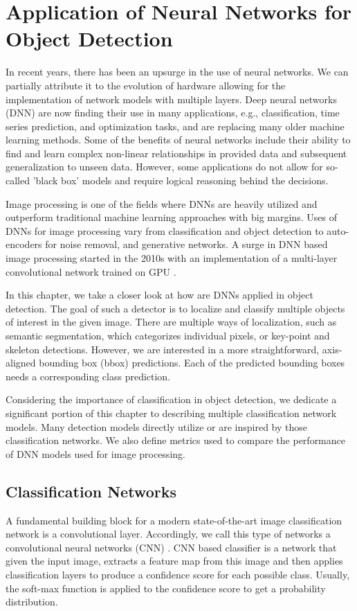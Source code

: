\chapter{Application of Neural Networks for Object Detection}
\label{chap:nns}
In recent years, there has been an upsurge in the use of neural networks. We can partially attribute it to the evolution of hardware allowing for the implementation of network models with multiple layers. Deep neural networks (DNN) are now finding their use in many applications, e.g., classification, time series prediction, and optimization tasks, and are replacing many older machine learning methods. Some of the benefits of neural networks include their ability to find and learn complex non-linear relationships in provided data and subsequent generalization to unseen data. However, some applications do not allow for so-called 'black box' models and require logical reasoning behind the decisions.

Image processing is one of the fields where DNNs are heavily utilized and outperform traditional machine learning approaches with big margins. Uses of DNNs for image processing vary from classification and object detection to auto-encoders for noise removal, and generative networks. A surge in DNN based image processing started in the 2010s with an implementation of a multi-layer convolutional network trained on GPU \cite{bib:deepOnGpu}. 

In this chapter, we take a closer look at how are DNNs applied in object detection. The goal of such a detector is to localize and classify multiple objects of interest in the given image. There are multiple ways of localization, such as semantic segmentation, which categorizes individual pixels, or key-point and skeleton detections. However, we are interested in a more straightforward, axis-aligned bounding box (bbox) predictions. Each of the predicted bounding boxes needs a corresponding class prediction.

Considering the importance of classification in object detection, we dedicate a significant portion of this chapter to describing multiple classification network models. Many detection models directly utilize or are inspired by those classification networks. We also define metrics used to compare the performance of DNN models used for image processing.


\section{Classification Networks}
\label{sec:clsnets}
A fundamental building block for a modern state-of-the-art image classification network is a convolutional layer. Accordingly, we call this type of networks a convolutional neural networks (CNN) \cite[ch.~9]{bib:dlbook}. CNN based classifier is a network that given the input image, extracts a feature map from this image and then applies classification layers to produce a confidence score for each possible class. Usually, the soft-max function is applied to the confidence score to get a probability distribution.

